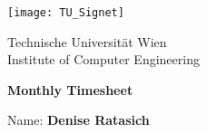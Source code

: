 \documentclass[10pt,a4paper,landscape]{article}
\begin{document}
\begin{minipage}[b]{0.05\textwidth}
  \texttt{[image: TU\_Signet]}
\end{minipage}
\hfill
\begin{minipage}[b]{0.94\textwidth}
  \begin{minipage}[b]{0.3\textwidth}
    Technische Universität Wien\\
    Institute of Computer Engineering
  \end{minipage}
  \hfill
  \begin{minipage}[b]{0.2\textwidth}
    \bf \Large
    Monthly Timesheet
  \end{minipage}
  \hfill
  \begin{minipage}[b]{0.29\textwidth}
    \begin{flushright}
      Name: \textbf{Denise Ratasich}
    \end{flushright}
  \end{minipage}
  \vspace{0.5mm}
\end{minipage}
\end{document}
